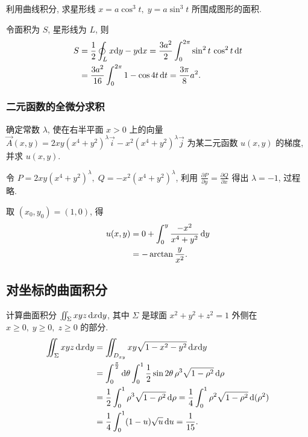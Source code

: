 \documentclass[a4paper,10pt,fleqn]{article}
\newcommand{\pdif}[2]{\frac{\partial #1}{\partial #2}}
\begin{document}
\begin{exmp}
    利用曲线积分, 求星形线 $x=a\cos^3t,\;y=a\sin^3t$ 所围成图形的面积.

    令面积为 $S$, 星形线为 $L$, 则
    \begin{align*}
        S & =\frac{1}{2}\oint_Lx{\rm d}y-y{\rm d}x=\frac{3a^2}{2}\int_0^{2\pi}\sin^2t\,\cos^2t\,{\rm d}t \\
          & =\frac{3a^2}{16}\int_0^{2\pi}1-\cos4t\,{\rm d}t=\frac{3\pi}{8}a^2.
    \end{align*}
\end{exmp}

\subsubsection*{二元函数的全微分求积}

\begin{exmp}
    确定常数 $\lambda$, 使在右半平面 $x>0$ 上的向量
    $\vec{A}(x,y)=2xy(x^4+y^2)^\lambda\vec{i}-x^2(x^4+y^2)^\lambda\vec{j}$ 为某二元函数 $u(x,y)$ 的梯度,
    并求 $u(x,y)$.

    令 $P=2xy(x^4+y^2)^\lambda,\;Q=-x^2(x^4+y^2)^\lambda$, 利用 $\pdif{P}{y}=\pdif{Q}{x}$ 得出
    $\lambda=-1$, 过程略.

    取 $(x_0,y_0)=(1,0)$, 得
    \begin{align*}
        u(x,y) & =0+\int_0^y\frac{-x^2}{x^4+y^2}\,{\rm d}y \\
               & =-\arctan\frac{y}{x^2}.
    \end{align*}
\end{exmp}

\subsection{对坐标的曲面积分}

\begin{exmp}
    计算曲面积分 $\iint_\Sigma xyz\,{\rm d}x{\rm d}y$, 其中 $\Sigma$ 是球面 $x^2+y^2+z^2=1$ 外侧在
    $x\geq0,\;y\geq0,\;z\geq0$ 的部分.
    \begin{align*}
        \iint_\Sigma xyz\,{\rm d}x{\rm d}y & =\iint_{D_{xy}}xy\sqrt{1-x^2-y^2}\,{\rm d}x{\rm d}y                                                              \\
                                           & =\int_0^{\frac{\pi}{2}}{\rm d}\theta\int_0^1\frac{1}{2}\sin2\theta\,\rho^3\sqrt{1-\rho^2}\,{\rm d}\rho           \\
                                           & =\frac{1}{2}\int_0^1\rho^3\sqrt{1-\rho^2}\,{\rm d}\rho=\frac{1}{4}\int_0^1\rho^2\sqrt{1-\rho^2}\,{\rm d}(\rho^2) \\
                                           & =\frac{1}{4}\int_0^1(1-u)\sqrt{u}\,{\rm d}u=\frac{1}{15}.
    \end{align*}
\end{exmp}
\end{document}
